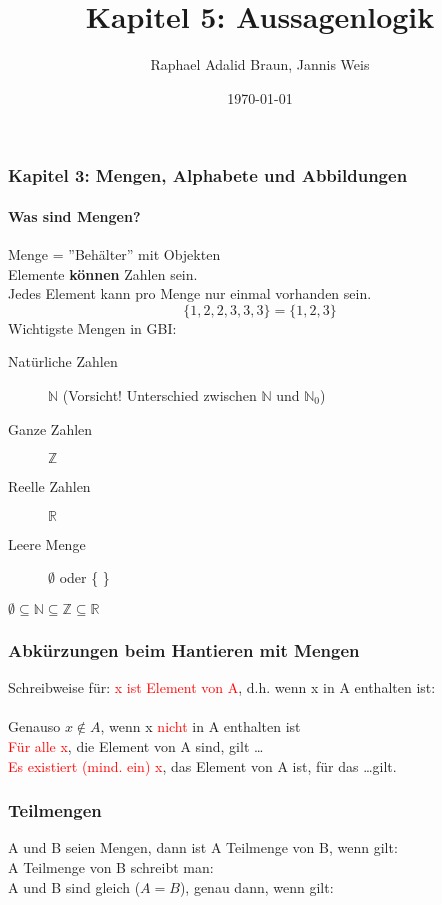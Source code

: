 \documentclass{beamer}
\title{Kapitel 5: Aussagenlogik}
\author{Raphael Adalid Braun, Jannis Weis}
\date{\today}
\institute{KIT - Karlruher Institut für Technologie}
\begin{document}
	\begin{frame}
		\frametitle{Kapitel 3: Mengen, Alphabete und Abbildungen}
		\framesubtitle{Was sind Mengen?}
		Menge = ''Behälter'' mit Objekten\\
		Elemente \textbf{können} Zahlen sein.\\
		Jedes Element kann pro Menge nur einmal vorhanden sein.\\
		\begin{equation*}
			\lbrace 1, 2, 2, 3, 3, 3\rbrace = \lbrace 1, 2, 3\rbrace
		\end{equation*}
		Wichtigste Mengen in GBI:\\
		\begin{description}
			\item[Natürliche Zahlen] $\mathbb{N}$ (Vorsicht! Unterschied zwischen $\mathbb{N}$ und $\mathbb{N}_0$)
			\item[Ganze Zahlen] $\mathbb{Z}$
			\item[Reelle Zahlen] $\mathbb{R}$
			\item[Leere Menge] $\emptyset$ oder \{   \}
		\end{description}
		$\emptyset\subseteq\mathbb{N}\subseteq\mathbb{Z}\subseteq\mathbb{R}$
	\end{frame}
	\begin{frame}
		\frametitle{Abkürzungen beim Hantieren mit Mengen}
		Schreibweise für: \textcolor{red}{x ist Element von A}, d.h. wenn x in A enthalten ist:\\
		\\
		Genauso $x \notin A$, wenn x \textcolor{red}{nicht} in A enthalten ist\\
		\textcolor{red}{Für alle x}, die Element von A sind, gilt \dots\\
		\textcolor{red}{Es existiert (mind. ein) x}, das Element von A ist, für das \dots gilt.
	\end{frame}
	\begin{frame}
		\frametitle{Teilmengen}
		A und B seien Mengen, dann ist A Teilmenge von B, wenn gilt:
		\center{$\forall x\in A: x\in B$}\\
		A Teilmenge von B schreibt man:
		\center{$A\subseteq B$}\\
		A und B sind gleich ($A = B$), genau dann, wenn gilt:
		\center{$A\subseteq B$ und $B\subseteq A$}
	\end{frame}
\end{document}
